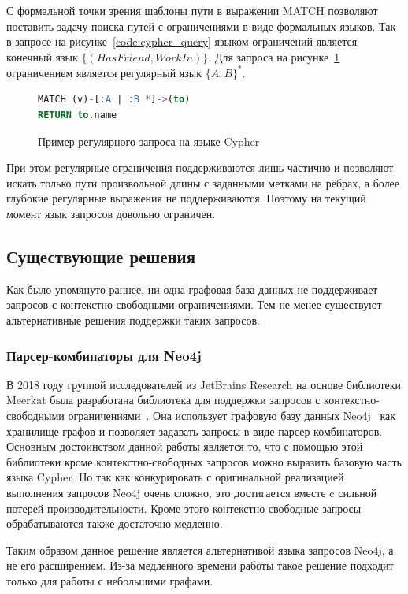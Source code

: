 \documentclass[14pt]{matmex-diploma-custom}
\begin{document}
С формальной точки зрения шаблоны пути в выражении MATCH позволяют поставить задачу поиска путей с ограничениями в виде формальных языков. Так в запросе на рисунке~\ref{code:cypher_query} языком ограничений является конечный язык $\{(HasFriend, WorkIn)\}$. Для запроса на рисунке~\ref{code:cypher_query_2} ограничением является регулярный язык $\{A, B\}^*$. 

\begin{figure}[h]
\begin{lstlisting}[language=sql]
MATCH (v)-[:A | :B *]->(to)
RETURN to.name
\end{lstlisting}
\caption{Пример регулярного запроса на языке Cypher}
\label{code:cypher_query_2}
\end{figure}

При этом регулярные ограничения поддерживаются лишь частично и позволяют искать только пути произвольной длины с заданными метками на рёбрах, а более глубокие регулярные выражения не поддерживаются. Поэтому на текущий момент язык запросов довольно ограничен.

\subsection{Существующие решения}
Как было упомянуто раннее, ни одна графовая база данных не поддерживает запросов с контекстно-свободными ограничениями. Тем не менее существуют альтернативные решения поддержки таких запросов. 

\subsubsection{Парсер-комбинаторы для Neo4j}\label{sec:pareser-combinators}
В 2018 году группой исследователей из JetBrains Research на основе библиотеки Meerkat была разработана библиотека для поддержки запросов с контекстно-свободными ограничениями~\cite{parser-combinators}. Она использует графовую базу данных Neo4j~\cite{neo4j} как хранилище графов и позволяет задавать запросы в виде парсер-комбинаторов. Основным достоинством данной работы является то, что с помощью этой библиотеки кроме контекстно-свободных запросов можно выразить базовую часть языка Cypher. Но так как конкурировать с оригинальной реализацией выполнения запросов Neo4j очень сложно, это достигается вместе c сильной потерей производительности. Кроме этого контекстно-свободные запросы обрабатываются также достаточно медленно.

Таким образом данное решение является альтернативой языка запросов Neo4j, а не его расширением. Из-за медленного времени работы такое решение подходит только для работы с небольшими графами. 
\end{document}
